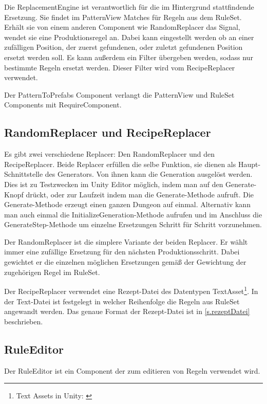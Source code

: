 Die ReplacementEngine ist verantwortlich für die im Hintergrund stattfindende Ersetzung. Sie findet im PatternView Matches für Regeln aus dem RuleSet. Erhält sie von einem anderen Component wie RandomReplacer das Signal, wendet sie eine Produktionsregel an. Dabei kann eingestellt werden ob an einer zufälligen Position, der zuerst gefundenen, oder zuletzt gefundenen Position ersetzt werden soll. Es kann außerdem ein Filter übergeben werden, sodass nur bestimmte Regeln ersetzt werden. Dieser Filter wird vom RecipeReplacer verwendet.

Der PatternToPrefabs Component verlangt die PatternView und RuleSet Components mit RequireComponent.

\subsection{RandomReplacer und RecipeReplacer}\label{ss.replacers}

Es gibt zwei verschiedene Replacer: Den RandomReplacer und den RecipeReplacer. Beide Replacer erfüllen die selbe Funktion, sie dienen als Haupt-Schnittstelle des Generators. Von ihnen kann die Generation ausgelöst werden. Dies ist zu Testzwecken im Unity Editor möglich, indem man auf den Generate-Knopf drückt, oder zur Laufzeit indem man die Generate-Methode aufruft. Die Generate-Methode erzeugt einen ganzen Dungeon auf einmal. Alternativ kann man auch einmal die InitializeGeneration-Methode aufrufen und im Anschluss die GenerateStep-Methode um einzelne Ersetzungen Schritt für Schritt vorzunehmen.

Der RandomReplacer ist die simplere Variante der beiden Replacer. Er wählt immer eine zufällige Ersetzung für den nächsten Produktionsschritt. Dabei gewichtet er die einzelnen möglichen Ersetzungen gemäß der Gewichtung der zugehörigen Regel im RuleSet.

Der RecipeReplacer verwendet eine Rezept-Datei des Datentypen TextAsset\footnote{Text Assets in Unity: \cite[Seite: class-TextAsset]{unityManual}}. In der Text-Datei ist festgelegt in welcher Reihenfolge die Regeln aus RuleSet angewandt werden. Das genaue Format der Rezept-Datei ist in \ref{s.rezeptDatei} beschrieben.

\subsection{RuleEditor}\label{ss.ruleEditor}

Der RuleEditor ist ein Component der zum editieren von Regeln verwendet wird. 

